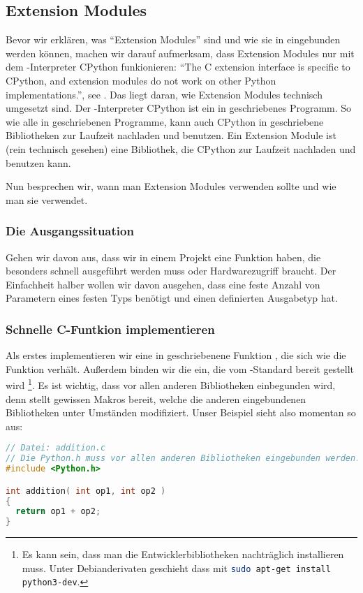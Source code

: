 \subsection{Extension Modules}
\label{section:python_mit_c:extension_modules}
Bevor wir erklären, was ``Extension Modules'' sind und wie sie in \Python eingebunden werden können, machen wir darauf aufmerksam,
dass Extension Modules nur mit dem \Python-Interpreter CPython funkionieren:
``The C extension interface is specific to CPython, and extension modules do not work on other Python implementations.'',
see \cite[Extending Python with C or C++; \S 1]{Python3, Python2}.
Das liegt daran, wie Extension Modules technisch umgesetzt sind.
Der \Python-Interpreter CPython ist ein in \C geschriebenes Programm.
So wie alle in \C geschriebenen Programme, kann auch CPython in \C geschriebene Bibliotheken zur Laufzeit nachladen und benutzen.
Ein Extension Module ist (rein technisch gesehen) eine \C Bibliothek, die CPython zur Laufzeit nachladen und benutzen kann.

Nun besprechen wir, wann man Extension Modules verwenden sollte und wie man sie verwendet.

\subsubsection{Die Ausgangssituation}
Gehen wir davon aus, dass wir in einem \Python Projekt eine Funktion  haben, die besonders schnell ausgeführt werden muss oder Hardwarezugriff braucht.
Der Einfachheit halber wollen wir davon ausgehen, dass  eine feste Anzahl von Parametern eines festen Typs benötigt und einen definierten Ausgabetyp hat.

\subsubsection{Schnelle C-Funtkion implementieren}
Als erstes implementieren wir eine in \C geschriebenene Funktion , die sich wie die Funktion  verhält.
Außerdem binden wir die  ein, die vom \Python-Standard bereit gestellt wird%
\footnote{Es kann sein, dass man die Entwicklerbibliotheken nachträglich installieren muss.
Unter Debianderivaten geschieht dass mit \lstinline[language=bash]|sudo apt-get install python3-dev|.}.
Es ist wichtig, dass  vor allen anderen Bibliotheken einbegunden wird,
denn  stellt gewissen Makros bereit, welche die anderen eingebundenen Bibliotheken unter Umständen modifiziert.
Unser Beispiel sieht also momentan so aus:
\begin{lstlisting}[language=C++, style=CPP]
// Datei: addition.c
// Die Python.h muss vor allen anderen Bibliotheken eingebunden werden.
#include <Python.h>

int addition( int op1, int op2 )
{
  return op1 + op2;
}
\end{lstlisting}

